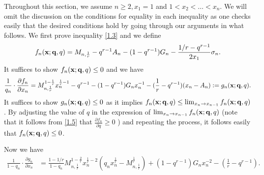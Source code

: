 \documentclass[11pt]{amsart}
\numberwithin{equation}{section}
\theoremstyle{definition}
\theoremstyle{remark}
\begin{document}
   Throughout this section, we assume $n \geq 2, x_1=1$ and $1<x_2< \ldots <x_n$. We will omit the discussion on the conditions for equality in each inequality as one checks easily that the desired conditions hold by going through our arguments in what follows. We first prove inequality \eqref{1.3} and we define
\begin{equation*}
  f_n({\bf x};{\bf q},q)=M_{n,\frac {1}{r}}-q^{r-1} A_n -(1-q^{r-1}) G_n - \frac
   {1/r-q^{r-1}}{2x_1}\sigma_n.
\end{equation*}
   It suffices to show $f_n({\bf x}; {\bf q}, q) \leq 0$ and we have
\begin{equation*}
  \frac {1}{q_n}\cdot\frac {\partial {f_n}}{\partial{x_n}}
= M^{1-\frac {1}{r}}_{n,\frac {1}{r}}x^{\frac {1}{r}-1}_n-q^{r-1}
-(1-q^{r-1}) G_nx^{-1}_n - (\frac 1r-q^{r-1})(x_n-A_n) :=g_n({\bf x};
{\bf q}, q).
\end{equation*}
  It suffices to show $g_n({\bf x}; {\bf q}, q) \leq 0$ as it implies $f_n({\bf x};{\bf q},q) \leq \lim_{x_n \rightarrow x_{n-1}}f_n({\bf x};{\bf q},q)$. By adjusting the value of $q$ in the expression of $\lim_{x_n \rightarrow x_{n-1}}f_n({\bf x};{\bf q},q)$ (note that it follows from \eqref{1.5} that $\frac {\partial {f_n}}{\partial{q}} \geq 0$ ) and repeating the process, it follows easily that $f_n({\bf x}; {\bf q}, q) \leq 0$.

  Now we have
\begin{align*}
\frac 1{1-q_n}\cdot\frac {\partial {g_n}}{\partial{x_n}} &=\frac {1-1/r}{1-q_n}M^{1-\frac
{2}{r}}_{n,\frac {1}{r}}x^{\frac {1}{r}-2}_n\left (q_nx^{\frac
{1}{r}}_n -M^{\frac {1}{r}}_{n,\frac {1}{r}}\right
)+(1-q^{r-1})G_nx^{-2}_n-(\frac 1r-q^{r-1}).
\end{align*}
\end{document}
